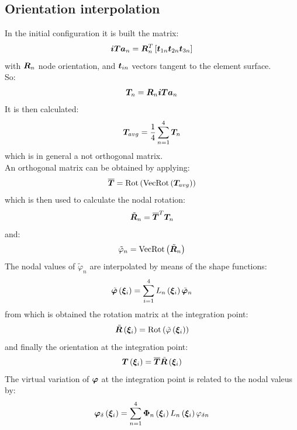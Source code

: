 \subsection{Orientation interpolation}
In the initial configuration it is built the matrix:
\begin{equation}
\bm{ iTa }_n = \bm{ R }_n^T \left[  \bm{ t }_{ 1n } \bm{ t }_{ 2n } \bm{ t }_{ 3n }  \right]
\end{equation}
with $\bm{ R }_n$ node orientation, and $\bm{t}_{in}$ vectors tangent to the element surface.\\
So:
\begin{equation}
\bm{T}_{n} = \bm{ R }_n \bm{ iTa }_n
\end{equation}
It is then calculated:
\begin{equation}
\bm{ T }_{ avg } = \frac{ \displaystyle{  1  } }{ \displaystyle{  4  }} \sum_{ n = 1 }^{ 4 } \bm{ T }_n
\end{equation}
which is in general a not orthogonal matrix.\\
An orthogonal matrix can be obtained by applying:
\begin{equation}
\overline{ \bm{ T } } = \text{Rot} \left(   \text{VecRot} \left(   \bm{ T }_{avg}   \right)    \right)
\end{equation}
which is then used to calculate the nodal rotation:
\begin{equation}
\tilde{ \bm{ R } }_{ n } = \overline{ \bm{ T } } ^T \bm{ T }_n
\end{equation}
and:
\begin{equation}
\tilde{ \varphi }_n = \text{VecRot} \left(   \tilde{ \bm{ R } }_n   \right)
\end{equation}
The nodal values of $\tilde{ \varphi }_n$ are interpolated by means of the shape functions:
\begin{equation}
\tilde{ \bm{ \varphi } } \left(  \bm{ \xi }_{ i }  \right) = \sum_{ i = 1 }^{ 4 } L_n \left(  \bm{ \xi }_{ i }  \right) \tilde{ \bm{ \varphi } }_n
\end{equation}
from which is obtained the rotation matrix at the integration point:
\begin{equation}
\tilde{ \bm{ R } } \left(  \bm{ \xi }_{ i }  \right) = \text{Rot} \left(   \tilde{ \varphi } \left(  \bm{ \xi }_{ i }  \right)   \right)
\end{equation}
and finally the orientation at the integration point:
\begin{equation}
\bm{ T } \left(  \bm{ \xi }_{ i }  \right) = \overline{ \bm{ T } } \tilde{ \bm{ R } } \left(  \bm{ \xi }_{ i }  \right)
\end{equation}
The virtual variation of $\bm{\varphi}$ at the integration point is related to the nodal valeus by:
\begin{equation}
\bm{ \varphi }_{\delta} \left(  \bm{ \xi }_{ i }  \right) =
\sum_{ n = 1 }^{ 4 } \bm{ \Phi }_n \left(  \bm{ \xi }_{ i }  \right) L_n \left(  \bm{ \xi }_{ i }  \right) \varphi_{\delta n}
\end{equation}
